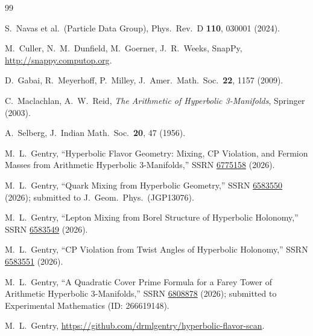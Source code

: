 \documentclass[11pt,a4paper]{article}
\theoremstyle{definition}
\theoremstyle{remark}
\begin{document}
\begin{thebibliography}{99}

S.~Navas et al.\ (Particle Data Group),
Phys.\ Rev.\ D \textbf{110}, 030001 (2024).

M.~Culler, N.~M.~Dunfield, M.~Goerner, J.~R.~Weeks,
SnapPy, \url{http://snappy.computop.org}.

D.~Gabai, R.~Meyerhoff, P.~Milley,
J.\ Amer.\ Math.\ Soc.\ \textbf{22}, 1157 (2009).

C.~Maclachlan, A.~W.~Reid,
\emph{The Arithmetic of Hyperbolic 3-Manifolds}, Springer (2003).

A.~Selberg,
J.\ Indian Math.\ Soc.\ \textbf{20}, 47 (1956).

M.~L.~Gentry,
``Hyperbolic Flavor Geometry: Mixing, CP Violation, and Fermion Masses
from Arithmetic Hyperbolic 3-Manifolds,''
SSRN \href{https://doi.org/10.2139/ssrn.6775158}{6775158} (2026).

M.~L.~Gentry,
``Quark Mixing from Hyperbolic Geometry,''
SSRN \href{https://doi.org/10.2139/ssrn.6583550}{6583550} (2026);
submitted to J.\ Geom.\ Phys.\ (JGP13076).

M.~L.~Gentry,
``Lepton Mixing from Borel Structure of Hyperbolic Holonomy,''
SSRN \href{https://doi.org/10.2139/ssrn.6583549}{6583549} (2026).

M.~L.~Gentry,
``CP Violation from Twist Angles of Hyperbolic Holonomy,''
SSRN \href{https://doi.org/10.2139/ssrn.6583551}{6583551} (2026).

M.~L.~Gentry,
``A Quadratic Cover Prime Formula for a Farey Tower of Arithmetic
Hyperbolic 3-Manifolds,''
SSRN \href{https://doi.org/10.2139/ssrn.6808878}{6808878} (2026);
submitted to Experimental Mathematics (ID: 266619148).

M.~L.~Gentry,
\url{https://github.com/drmlgentry/hyperbolic-flavor-scan}.

\end{thebibliography}
\end{document}
